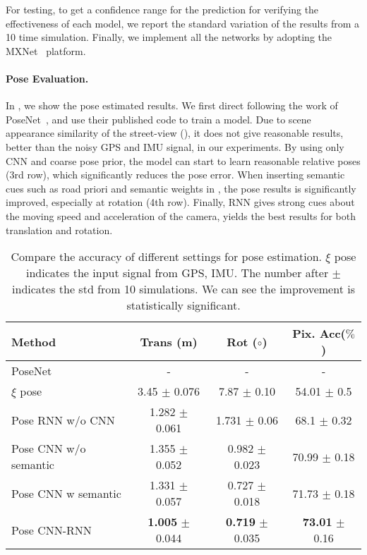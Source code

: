 For testing, to get a confidence range for the prediction for verifying the effectiveness of each model, we report the standard variation of the results from a 10 time simulation. Finally, we implement all the networks by adopting the MXNet~\cite{ChenLLLWWXXZZ15} platform.


\paragraph{Pose Evaluation.}
In , we show the pose estimated results. We first direct following the work of PoseNet~\cite{Kendall_2015_ICCV,kendall2017geometric}, and use their published code to train a model. Due to scene appearance similarity of the street-view (), it does not give reasonable results, \ie better than the noisy GPS and IMU signal, in our experiments.
By using only CNN and coarse pose prior, the model can start to learn reasonable relative poses (3rd row), which significantly reduces the pose error. When inserting semantic cues such as road priori and semantic weights in , the pose results is significantly improved, especially at rotation (4th row).
Finally, RNN gives strong cues about the moving speed and acceleration of the camera, yields the best results for both translation and rotation.

\begin{table*}
\center
\small
\begin{tabular}{lccc}
\toprule[0.1 em]
Method & Trans (m) & Rot ($\circ$) & Pix. Acc($\%$)\\
\hline
PoseNet~\cite{kendall2017geometric} & -  & -  & -  \\
$\xi$ pose & 3.45 $\pm$ 0.076 & 7.87 $\pm$ 0.10 & 54.01 $\pm$ 0.5 \\
Pose RNN w/o CNN & 1.282 $\pm$ 0.061  & 1.731 $\pm$ 0.06 &  68.1 $\pm$ 0.32 \\
Pose CNN w/o semantic & 1.355 $\pm$ 0.052  & 0.982 $\pm$ 0.023 & 70.99 $\pm$ 0.18 \\
Pose CNN w semantic & 1.331 $\pm$ 0.057  & 0.727 $\pm$ 0.018 & 71.73 $\pm$ 0.18  \\
Pose CNN-RNN  & \textbf{1.005} $\pm$ 0.044  & \textbf{0.719} $\pm$ 0.035  & \textbf{73.01} $\pm$ 0.16  \\
\toprule[0.1 em]
\end{tabular}
\caption{Compare the accuracy of different settings for pose estimation.
$\xi$ pose indicates the input signal from GPS, IMU.
The number after $\pm$ indicates the std from 10 simulations. We can see the improvement is statistically significant.}
\label{tbl:pose}
\vspace{-0.3\baselineskip}
\end{table*}

